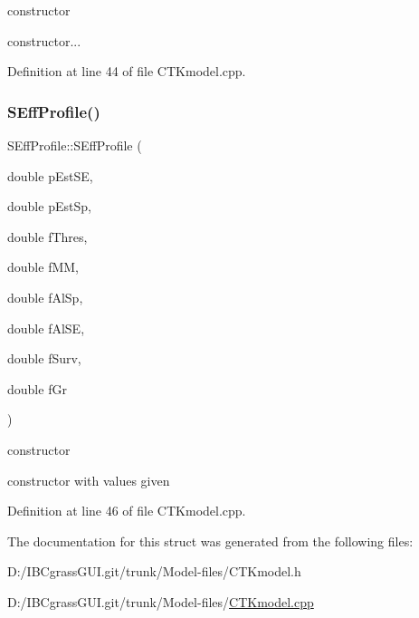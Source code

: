 constructor 

constructor... 

Definition at line 44 of file C\+T\+Kmodel.\+cpp.

\mbox{\label{struct_s_eff_profile_ad7e6450c568191c89494222bd802931b}} 
\subsubsection{\texorpdfstring{SEffProfile()}{SEffProfile()}\hspace{0.1cm}{\footnotesize\ttfamily [2/2]}}
{\footnotesize\ttfamily S\+Eff\+Profile\+::\+S\+Eff\+Profile (\begin{DoxyParamCaption}\item[{double}]{p\+Est\+SE,  }\item[{double}]{p\+Est\+Sp,  }\item[{double}]{f\+Thres,  }\item[{double}]{f\+MM,  }\item[{double}]{f\+Al\+Sp,  }\item[{double}]{f\+Al\+SE,  }\item[{double}]{f\+Surv,  }\item[{double}]{f\+Gr }\end{DoxyParamCaption})}



constructor 

constructor with values given 

Definition at line 46 of file C\+T\+Kmodel.\+cpp.



The documentation for this struct was generated from the following files\+:\begin{DoxyCompactItemize}
\item 
D\+:/\+I\+B\+Cgrass\+G\+U\+I.\+git/trunk/\+Model-\/files/C\+T\+Kmodel.\+h\item 
D\+:/\+I\+B\+Cgrass\+G\+U\+I.\+git/trunk/\+Model-\/files/\mbox{\hyperlink{_c_t_kmodel_8cpp}{C\+T\+Kmodel.\+cpp}}\end{DoxyCompactItemize}

